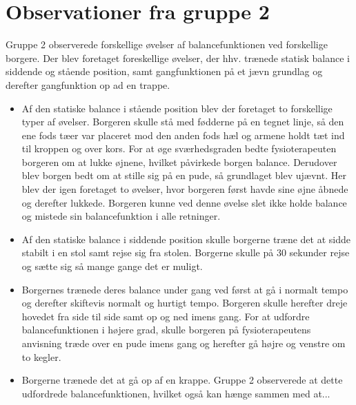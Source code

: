 \section{Observationer fra gruppe 2}
Gruppe 2 observerede forskellige øvelser af balancefunktionen ved forskellige borgere. Der blev foretaget foreskellige øvelser, der hhv. trænede statisk balance i siddende og stående position, samt gangfunktionen på et jævn grundlag og derefter gangfunktion op ad en trappe. 
\begin{itemize}
\item Af den statiske balance i stående position blev der foretaget to forskellige typer af øvelser. Borgeren skulle stå med fødderne på en tegnet linje, så den ene fods tæer var placeret mod den anden fods hæl og armene holdt tæt ind til kroppen og over kors. For at øge sværhedsgraden bedte fysioterapeuten borgeren om at lukke øjnene, hvilket påvirkede borgen balance. Derudover blev borgen bedt om at stille sig på en pude, så grundlaget blev ujævnt. Her blev der igen foretaget to øvelser, hvor borgeren først havde sine øjne åbnede og derefter lukkede. Borgeren kunne ved denne øvelse slet ikke holde balance og mistede sin balancefunktion i alle retninger. 
\item Af den statiske balance i siddende position skulle borgerne træne det at sidde stabilt i en stol samt rejse sig fra stolen. Borgerne skulle på 30 sekunder rejse og sætte sig så mange gange det er muligt. 
\item Borgernes trænede deres balance under gang ved først at gå i normalt tempo og derefter skiftevis normalt og hurtigt tempo. Borgeren skulle herefter dreje hovedet fra side til side samt op og ned imens gang. For at udfordre balancefunktionen i højere grad, skulle borgeren på fysioterapeutens anvisning træde over en pude imens gang og herefter gå højre og venstre om to kegler.
\item Borgerne trænede det at gå op af en krappe. Gruppe 2 observerede at dette udfordrede balancefunktionen, hvilket også kan hænge sammen med at...
\end{itemize} 

